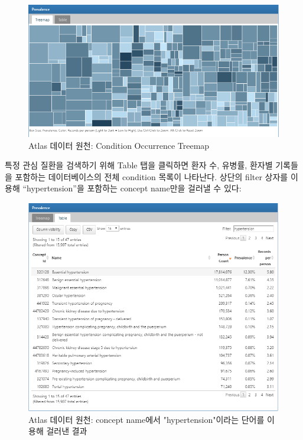 \documentclass[11pt]{book}
\theoremstyle{definition}
\theoremstyle{definition}
\theoremstyle{definition}
\theoremstyle{remark}
\begin{document}
\begin{figure}

{\centering \includegraphics[width=1\linewidth]{images/Characterization/atlasDataSourcesConditionTreemap} 

}

\caption{Atlas 데이터 원천: Condition Occurrence Treemap}\label{fig:atlasDataSourcesConditionTreemap}
\end{figure}

특정 관심 질환을 검색하기 위해 Table 탭을 클릭하면 환자 수, 유병률,
환자별 기록들을 포함하는 데이터베이스의 전체 condition 목록이 나타난다.
상단의 filter 상자를 이용해 ``hypertension''을 포함하는 concept name만을
걸러낼 수 있다:

\begin{figure}

{\centering \includegraphics[width=1\linewidth]{images/Characterization/atlasDataSourcesConditionFiltered} 

}

\caption{Atlas 데이터 원천: concept name에서 "hypertension"이라는 단어를 이용해 걸러낸 결과}\label{fig:atlasDataSourcesConditionFiltered}
\end{figure}
\end{document}
